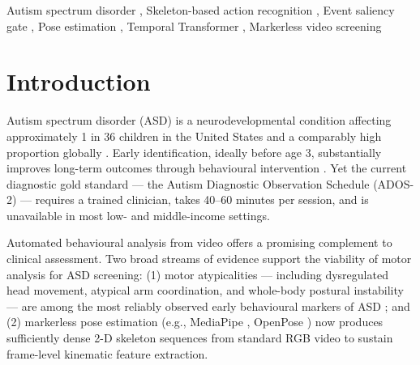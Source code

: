 \documentclass[a4paper,fleqn]{cas-sc}
\begin{document}
\begin{keywords}
  Autism spectrum disorder \sep
  Skeleton-based action recognition \sep
  Event saliency gate \sep
  Pose estimation \sep
  Temporal Transformer \sep
  Markerless video screening
\end{keywords}

\maketitle

\section{Introduction}
\label{sec:intro}

Autism spectrum disorder (ASD) is a neurodevelopmental condition affecting
approximately 1 in 36 children in the United States \citep{maenner2023prevalence}
and a comparably high proportion globally \citep{world2022world}.
Early identification, ideally before age 3, substantially improves long-term
outcomes through behavioural intervention \citep{dawson2008early}.
Yet the current diagnostic gold standard --- the Autism Diagnostic Observation
Schedule (ADOS-2) \citep{lord2012ados} --- requires a trained clinician, takes
40--60 minutes per session, and is unavailable in most low- and middle-income
settings.

Automated behavioural analysis from video offers a promising complement to
clinical assessment.
Two broad streams of evidence support the viability of motor analysis for ASD
screening: (1) motor atypicalities --- including dysregulated head movement,
atypical arm coordination, and whole-body postural instability --- are among
the most reliably observed early behavioural markers of ASD
\citep{esposito2011motor,bhat2012perspectives,travers2015atypical}; and
(2) markerless pose estimation (e.g., MediaPipe \citep{lugaresi2019mediapipe},
OpenPose \citep{cao2017realtime}) now produces sufficiently dense 2-D skeleton
sequences from standard RGB video to sustain frame-level kinematic feature
extraction.
\end{document}

